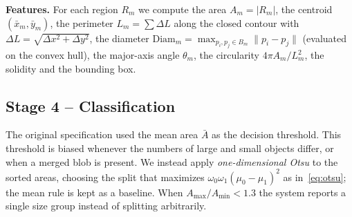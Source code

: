 \documentclass[conference,a4paper]{IEEEtran}
\begin{document}
\textbf{Features.} For each region $R_m$ we compute the area $A_m=|R_m|$, the centroid $(\bar x_m,\bar y_m)$, the perimeter $L_m=\sum\Delta L$ along the closed contour with $\Delta L=\sqrt{\Delta x^2+\Delta y^2}$, the diameter $\mathrm{Diam}_m=\max_{p_i,p_j\in B_m}\lVert p_i-p_j\rVert$ (evaluated on the convex hull), the major-axis angle $\theta_m$, the circularity $4\pi A_m/L_m^2$, the solidity and the bounding box.

\subsection{Stage 4 -- Classification}
The original specification used the mean area $\bar A$ as the decision threshold. This threshold is biased whenever the numbers of large and small objects differ, or when a merged blob is present. We instead apply \emph{one-dimensional Otsu} to the sorted areas, choosing the split that maximizes $\omega_0\omega_1(\mu_0-\mu_1)^2$ as in~\eqref{eq:otsu}; the mean rule is kept as a baseline. When $A_{\max}/A_{\min}<1.3$ the system reports a single size group instead of splitting arbitrarily.
\end{document}
